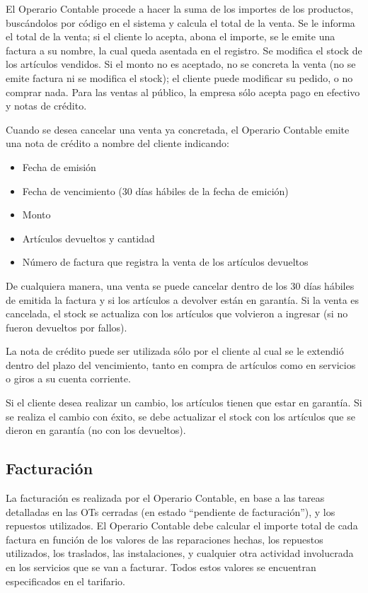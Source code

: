 \documentclass[12pt]{extarticle}
\begin{document}
\begin{spacing}{1.2}
    El Operario Contable procede a hacer la suma de los importes de los productos, buscándolos por código en el sistema y calcula el total de la venta. Se le informa el total de la venta; si el cliente lo acepta, abona el importe, se le emite una factura a su nombre, la cual queda asentada en el registro. Se modifica el stock de los artículos vendidos. 
    Si el monto no es aceptado, no se concreta la venta (no se emite factura ni se modifica el stock); el cliente puede modificar su pedido, o no comprar nada.
    Para las ventas al público, la empresa sólo acepta pago en efectivo y notas de crédito.

    Cuando se desea cancelar una venta ya concretada, el Operario Contable emite una nota de crédito a nombre del cliente indicando:
    \begin{itemize}
        \item Fecha de emisión
        \item Fecha de vencimiento (30 días hábiles de la fecha de emición)
        \item Monto
        \item Artículos devueltos y cantidad
        \item Número de factura que registra la venta de los artículos devueltos
    \end{itemize}
    De cualquiera manera, una venta se puede cancelar dentro de los 30 días hábiles de emitida la factura y si los artículos a devolver están en garantía. Si la venta es cancelada, el stock se actualiza con los artículos que volvieron a ingresar (si no fueron devueltos por fallos).

    La nota de crédito puede ser utilizada sólo por el cliente al cual se le extendió dentro del plazo del vencimiento, tanto en compra de artículos como en servicios o giros a su cuenta corriente.

    Si el cliente desea realizar un cambio, los artículos tienen que estar en garantía. Si se realiza el cambio con éxito, se debe actualizar el stock con los artículos que se dieron en garantía (no con los devueltos).

    \subsection{Facturación}


    La facturación es realizada por el Operario Contable, en base a las tareas detalladas en las OTs{} cerradas (en estado ``pendiente de facturación''), y los repuestos utilizados. El Operario Contable debe calcular el importe total de cada factura en función de los valores de las reparaciones hechas, los repuestos utilizados, los traslados, las instalaciones, y cualquier otra actividad involucrada en los servicios que se van a facturar. Todos estos valores se encuentran especificados en el tarifario.
    

\end{spacing}
\end{document}

